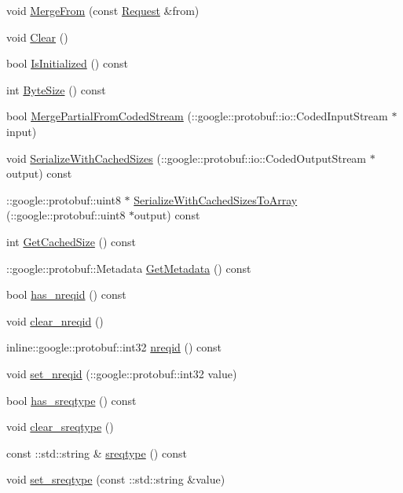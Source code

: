 \begin{DoxyCompactItemize}
void \hyperlink{classRequest_a8a13369f143712a3ab2a5edd22b3ac0d}{Merge\-From} (const \hyperlink{classRequest}{Request} \&from)
\item 
void \hyperlink{classRequest_a967c9dbe165fc641d553429b402798c5}{Clear} ()
\item 
bool \hyperlink{classRequest_a0bf7dcc362a8cb1b88ff47456fa2caf9}{Is\-Initialized} () const 
\item 
int \hyperlink{classRequest_a291392216821d4876ec57fce880c68d8}{Byte\-Size} () const 
\item 
bool \hyperlink{classRequest_a04e42bcd0402b4f0489d173566b62a3d}{Merge\-Partial\-From\-Coded\-Stream} (\-::google\-::protobuf\-::io\-::\-Coded\-Input\-Stream $\ast$input)
\item 
void \hyperlink{classRequest_a498e3dd9cb1aa76446d9edddf75cbcae}{Serialize\-With\-Cached\-Sizes} (\-::google\-::protobuf\-::io\-::\-Coded\-Output\-Stream $\ast$output) const 
\item 
\-::google\-::protobuf\-::uint8 $\ast$ \hyperlink{classRequest_a5fcea3c6f963f82bf5589b600bf7abcb}{Serialize\-With\-Cached\-Sizes\-To\-Array} (\-::google\-::protobuf\-::uint8 $\ast$output) const 
\item 
int \hyperlink{classRequest_a252b5da3a413b739e008dcf193b10384}{Get\-Cached\-Size} () const 
\item 
\-::google\-::protobuf\-::\-Metadata \hyperlink{classRequest_a6d8615a38b760578f1f0689c3d61ec0d}{Get\-Metadata} () const 
\item 
bool \hyperlink{classRequest_ad97f3fe666bad5150288e6c5290b8b91}{has\-\_\-nreqid} () const 
\item 
void \hyperlink{classRequest_aac24c3b0fc10aa1e70d3ef8ae0e59ade}{clear\-\_\-nreqid} ()
\item 
inline\-::google\-::protobuf\-::int32 \hyperlink{classRequest_a604490e6261ae34401ed4087983f4f18}{nreqid} () const 
\item 
void \hyperlink{classRequest_acfcd61564695d1085c032b0daeb21dfa}{set\-\_\-nreqid} (\-::google\-::protobuf\-::int32 value)
\item 
bool \hyperlink{classRequest_adb86e88c30582cad6050515eb211865e}{has\-\_\-sreqtype} () const 
\item 
void \hyperlink{classRequest_a6f03523e15dd294702cee128d43cc73a}{clear\-\_\-sreqtype} ()
\item 
const \-::std\-::string \& \hyperlink{classRequest_a0b0823d9be0e974f16dffea298cf7472}{sreqtype} () const 
\item 
void \hyperlink{classRequest_aa739c24a65b66b66f0327072da3eb11f}{set\-\_\-sreqtype} (const \-::std\-::string \&value)

\end{DoxyCompactItemize}
